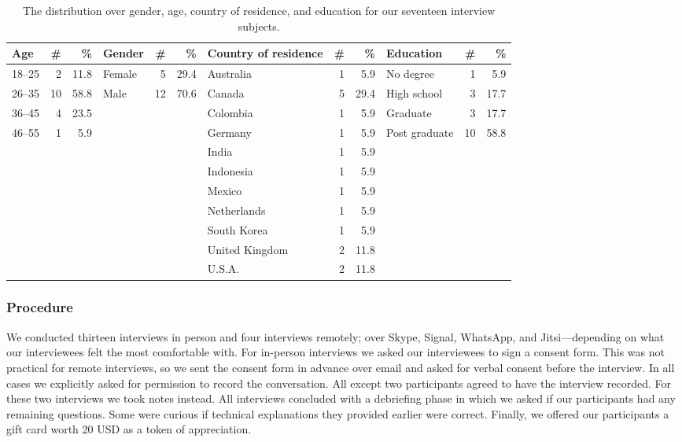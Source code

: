 \begin{table}[ht]
    \centering
    \begin{tabular}{l r r l r r l r r l r r}
    \toprule
    Age & \# & \% &
    Gender & \# & \% &
    Country of residence & \# & \% &
    Education & \# & \% \\
    \midrule
    18--25 & 2  & 11.8 & Female & 5  & 29.4 & Australia      & 1 & 5.9  & No degree     & 1  & 5.9 \\
    26--35 & 10 & 58.8 & Male   & 12 & 70.6 & Canada         & 5 & 29.4 & High school   & 3  & 17.7 \\
    36--45 & 4  & 23.5 &        &    &      & Colombia       & 1 & 5.9  & Graduate      & 3  & 17.7 \\
    46--55 & 1  & 5.9  &        &    &      & Germany        & 1 & 5.9  & Post graduate & 10 & 58.8 \\
           &    &      &        &    &      & India          & 1 & 5.9  & & & \\
           &    &      &        &    &      & Indonesia      & 1 & 5.9  & & & \\
           &    &      &        &    &      & Mexico         & 1 & 5.9  & & & \\
           &    &      &        &    &      & Netherlands    & 1 & 5.9  & & & \\
           &    &      &        &    &      & South Korea    & 1 & 5.9  & & & \\
           &    &      &        &    &      & United Kingdom & 2 & 11.8 & & & \\
           &    &      &        &    &      & U.S.A.         & 2 & 11.8 & & & \\
    \bottomrule
    \end{tabular}
    \caption{The distribution over gender, age, country of residence, and
    education for our seventeen interview subjects.}
    \label{tab:interviewees}
\end{table}

\subsubsection{Procedure}

We conducted thirteen interviews in person and four interviews remotely; over
Skype, Signal, WhatsApp, and Jitsi---depending on what our interviewees felt
the most comfortable with.  For in-person interviews we asked our interviewees
to sign a consent form.  This was not practical for remote interviews, so we
sent the consent form in advance over email and asked for verbal consent before
the interview.  In all cases we explicitly asked for permission to record the
conversation.  All except two participants agreed to have the interview
recorded.  For these two interviews we took notes instead.  All interviews
concluded with a debriefing phase in which we asked if our participants had any
remaining questions.  Some were curious if technical explanations they provided
earlier were correct.  Finally, we offered our participants a gift card worth
20 USD as a token of appreciation.

